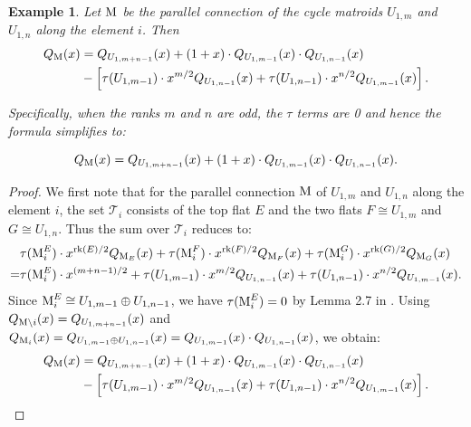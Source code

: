 \documentclass[11pt]{article}
\newcommand{\M}{\normalfont\text{M}}
\newcommand{\rk}{\normalfont\text{rk}}
\newtheorem{example}[theorem]{Example}
\theoremstyle{remark}
\begin{document}
\begin{example}\label{ex:deletion_formula_ll_connection}
    Let $\M$ be the parallel connection of the cycle matroids $U_{1, m}$ and $U_{1, n}$ along the element $i$. Then
    \begin{align*}
        Q_{\M}(x) & = Q_{U_{1, m+n-1}}(x) + (1 + x)\cdot Q_{U_{1, m-1}}(x)\cdot Q_{U_{1, n-1}}(x)                                   \\
                  & -\left[ \tau(U_{1, m-1})\cdot x^{m/2}Q_{U_{1, n-1}}(x) + \tau(U_{1, n-1})\cdot x^{n/2}Q_{U_{1, m-1}}(x)\right].
    \end{align*}

    Specifically, when the ranks $m$ and $n$ are odd, the $\tau$ terms are 0 and hence the formula simplifies to:

    \[
        Q_{\M}(x) = Q_{U_{1, m+n-1}}(x) + (1 + x)\cdot Q_{U_{1, m-1}}(x)\cdot Q_{U_{1, n-1}}(x).
    \]
\end{example}
\begin{proof}
    We first note that for the parallel connection $\M$ of $U_{1, m}$ and $U_{1, n}$ along the element $i$, the set $\mathscr{T}_i$ consists of the top flat $E$ and the two flats $F\cong U_{1, m}$ and $G\cong U_{1, n}$.
    Thus the sum over $\mathscr{T}_i$ reduces to:
    \begin{align*}
          & \tau(\M^E_i)\cdot x^{\rk(E)/2}Q_{\M_E}(x) + \tau(\M^F_i)\cdot x^{\rk(F)/2}Q_{\M_F}(x) + \tau(\M^G_i)\cdot x^{\rk(G)/2}Q_{\M_G}(x)  \\
        = & \tau(\M^E_i)\cdot x^{(m+n-1)/2} + \tau(U_{1, m-1})\cdot x^{m/2}Q_{U_{1, n-1}}(x) + \tau(U_{1, n-1})\cdot x^{n/2}Q_{U_{1, m-1}}(x).
    \end{align*}
    Since $\M^E_i \cong U_{1, m-1} \oplus U_{1, n-1}$, we have $\tau(\M^E_i) = 0$ by Lemma 2.7 in \cite{braden-vysogorets}.
    Using $Q_{\M\setminus i}(x) = Q_{U_{1, m+n-1}}(x)$ and $Q_{\M_i}(x) = Q_{U_{1, m-1} \oplus U_{1, n-1}}(x)=Q_{U_{1, m-1}}(x)\cdot Q_{U_{1, n-1}}(x)$, we obtain:
    \begin{align*}
        Q_{\M}(x) & = Q_{U_{1, m+n-1}}(x) + (1 + x)\cdot Q_{U_{1, m-1}}(x)\cdot Q_{U_{1, n-1}}(x)                                   \\
                  & -\left[ \tau(U_{1, m-1})\cdot x^{m/2}Q_{U_{1, n-1}}(x) + \tau(U_{1, n-1})\cdot x^{n/2}Q_{U_{1, m-1}}(x)\right].
    \end{align*}
\end{proof}
\end{document}
